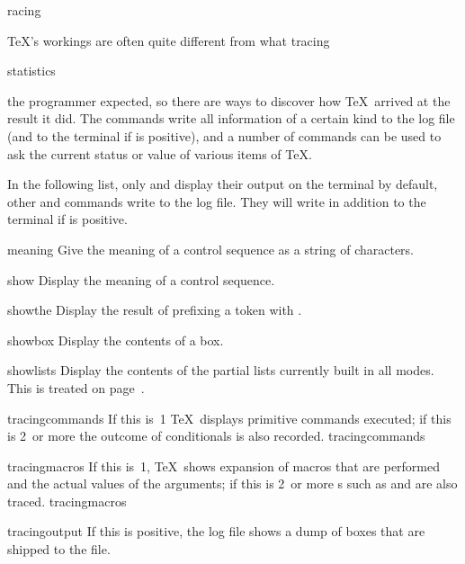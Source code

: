 \subject[trace]  Tracing

\TeX's workings are often quite different from what
\term tracing\par\term statistics\par
the programmer expected, so there are ways to discover how \TeX\
arrived at the result it did. The  
commands write
all information of a certain kind to the log file 
(and to the terminal if  is positive),
and a number of  commands can be used to ask the
current status or value of various items of \TeX.

In the following list, only  and 
display their output on the terminal by default,
other  and  commands
write to the log file. They will write in addition to
the terminal if  is positive.

\invent
\item meaning 
      Give the meaning of a control sequence as a string of characters.

\item show 
      Display the meaning of a control sequence.

\item showthe 
      Display the result of prefixing a token with .

\item showbox 
      Display the contents of a box.

\item showlists 
      Display
      the contents of the partial lists
      currently built in all modes.
      This is treated on
      page~\pgref[showlists].

\item tracingcommands
      If this is~1 \TeX\ displays primitive commands executed; 
      if this is 2~or more the outcome of conditionals is also recorded.
      \csterm tracingcommands\par

\item tracingmacros 
      If this is~1, \TeX\ shows expansion of macros 
      that are performed and the actual values of the arguments; 
      if this is 2~or more \gr{token parameter}s such as
       and  are also traced.
      \csterm tracingmacros\par

\item tracingoutput 
      If this is positive, the log file shows a dump of boxes 
      that are shipped to the  file.

